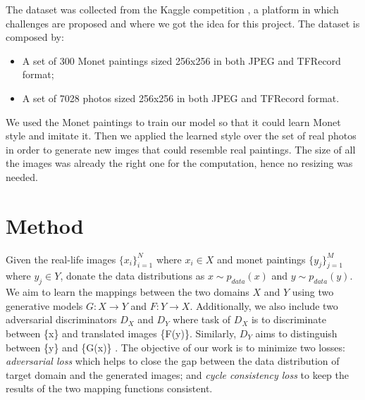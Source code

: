 \documentclass[10pt,twocolumn,letterpaper]{article}
\begin{document}
The dataset was collected from the Kaggle competition \cite{kaggle}, a platform in which challenges are proposed and where we got the idea for this project. The dataset is composed by:
\begin{itemize}
\item A set of 300 Monet paintings sized 256x256 in both JPEG and TFRecord format;
\item A set of 7028 photos sized 256x256 in both JPEG and TFRecord format.
\end{itemize}
We used the Monet paintings to train our model so that it could learn Monet style and imitate it. Then we applied the learned style over the set of real photos in order to generate new imges that could resemble real paintings. The size of all the images was already the right one for the computation, hence no resizing was needed. 

\section{Method}
Given the real-life images $\{x_i\}_{i=1}^N$ where $x_{i}\in X$ and monet paintings $\{y_j\}_{j=1}^M$ where $y_{j}\in Y$, donate the data distributions as $x \sim p_{data}(x)$ and $y \sim p_{data}(y)$. We aim to learn the mappings between the two domains $X$ and $Y$ using two generative models $G : X \longrightarrow Y$ and $F : Y \longrightarrow X$. Additionally, we also include two adversarial discriminators $D_{X}$ and $D_{Y}$ where task of $D_{X}$ is to discriminate between \{x\} and translated images \{F(y)\}. Similarly, $D_{Y}$ aims to distinguish between \{y\} and \{G(x)\} \cite{cyclegan}. The objective of our work is to minimize two losses: \emph{adversarial loss} \cite{simplegan} which helps to close the gap between the data distribution of target domain and the generated images; and \emph{cycle consistency loss} to keep the results of the two mapping functions consistent.
\end{document}
